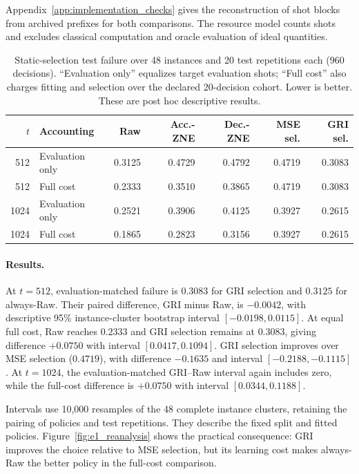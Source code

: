\documentclass[a4paper,onecolumn,unpublished,nopdfoutputerror]{quantumarticle}
\theoremstyle{plain}
\theoremstyle{definition}
\newcommand{\1}{\mathbf{1}}
\begin{document}
Appendix~\ref{app:implementation_checks} gives the reconstruction of shot blocks from archived prefixes for both comparisons. The resource model counts shots and excludes classical computation and oracle evaluation of ideal quantities.

\begin{table}[!ht]
\centering\small
\caption{Static-selection test failure over 48 instances and 20 test repetitions each (960 decisions). ``Evaluation only'' equalizes target evaluation shots; ``Full cost'' also charges fitting and selection over the declared 20-decision cohort. Lower is better. These are post hoc descriptive results.}
\label{tab:e1_reanalysis}
\setlength{\tabcolsep}{4pt}
\begin{tabular}{rlrrrrr}\toprule
$t$ & Accounting & Raw & Acc.-ZNE & Dec.-ZNE & MSE sel. & GRI sel.\\\midrule
512 & Evaluation only & 0.3125 & 0.4729 & 0.4792 & 0.4719 & 0.3083 \\
512 & Full cost & 0.2333 & 0.3510 & 0.3865 & 0.4719 & 0.3083 \\
1024 & Evaluation only & 0.2521 & 0.3906 & 0.4125 & 0.3927 & 0.2615 \\
1024 & Full cost & 0.1865 & 0.2823 & 0.3156 & 0.3927 & 0.2615 \\
\bottomrule\end{tabular}
\end{table}

\paragraph{Results.}
At $t=512$, evaluation-matched failure is $0.3083$ for GRI selection and $0.3125$ for always-Raw. Their paired difference, GRI minus Raw, is $-0.0042$, with descriptive 95\% instance-cluster bootstrap interval $[-0.0198,0.0115]$. At equal full cost, Raw reaches $0.2333$ and GRI selection remains at $0.3083$, giving difference $+0.0750$ with interval $[0.0417,0.1094]$. GRI selection improves over MSE selection ($0.4719$), with difference $-0.1635$ and interval $[-0.2188,-0.1115]$. At $t=1024$, the evaluation-matched GRI--Raw interval again includes zero, while the full-cost difference is $+0.0750$ with interval $[0.0344,0.1188]$.

Intervals use 10,000 resamples of the 48 complete instance clusters, retaining the pairing of policies and test repetitions. They describe the fixed split and fitted policies. Figure~\ref{fig:e1_reanalysis} shows the practical consequence: GRI improves the choice relative to MSE selection, but its learning cost makes always-Raw the better policy in the full-cost comparison.
\end{document}
